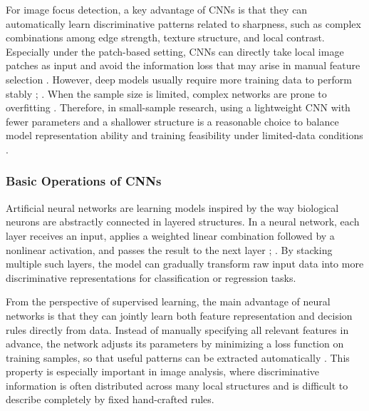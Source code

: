 \par For image focus detection, a key advantage of CNNs is that they can
automatically learn discriminative patterns related to sharpness, such as
complex combinations among edge strength, texture structure, and local contrast.
Especially under the patch-based setting, CNNs can directly take local image
patches as input and avoid the information loss that may arise in manual feature
selection \cite{lecun2002gradient,krizhevsky2012imagenet}. However, deep models
usually require more training data to perform stably
\cite[pp.~96--123,~224--270]{goodfellow2016deep}; \cite{shorten2019survey}. When
the sample size is limited, complex networks are prone to overfitting
\cite[pp.~108--123,~224--270]{goodfellow2016deep}. Therefore, in small-sample
research, using a lightweight CNN with fewer parameters and a shallower
structure is a reasonable choice to balance model representation ability and
training feasibility under limited-data conditions
\cite{howard2017mobilenets,shorten2019survey}.

\subsubsection{Basic Operations of CNNs}
\par Artificial neural networks are learning models inspired by the way
biological neurons are abstractly connected in layered structures. In a neural
network, each layer receives an input, applies a weighted linear combination
followed by a nonlinear activation, and passes the result to the next layer
\cite[pp.~164--223]{goodfellow2016deep}; \cite{lecun2002gradient}. By stacking
multiple such layers, the model can gradually transform raw input data into more
discriminative representations for classification or regression tasks.

\par From the perspective of supervised learning, the main advantage of neural
networks is that they can jointly learn both feature representation and decision
rules directly from data. Instead of manually specifying all relevant features
in advance, the network adjusts its parameters by minimizing a loss function on
training samples, so that useful patterns can be extracted automatically
\cite[pp.~164--223]{goodfellow2016deep}. This property is especially important
in image analysis, where discriminative information is often distributed across
many local structures and is difficult to describe completely by fixed
hand-crafted rules.

